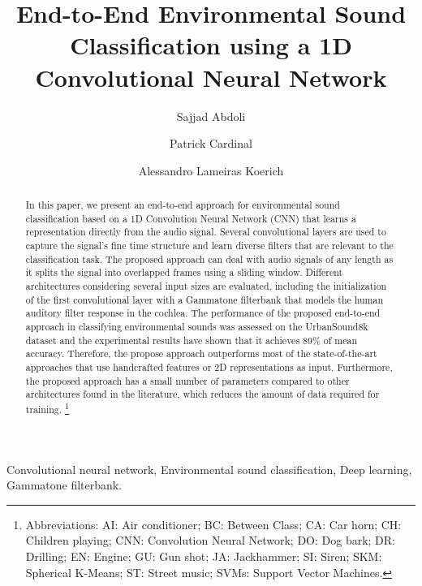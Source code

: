 \documentclass[preprint,final,12pt]{elsarticle}
\newcommand\blfootnote[1]{\begingroup
  \renewcommand\thefootnote{}\footnote{#1}\addtocounter{footnote}{-1}\endgroup
}
\begin{document}
\begin{frontmatter}

\title{End-to-End Environmental Sound Classification using a 1D Convolutional Neural Network}


\author{Sajjad Abdoli}
\author{Patrick Cardinal}
\author{Alessandro Lameiras Koerich}

\address{Department of Software and IT Engineering, \'{E}cole de Technologie Sup\'{e}rieure, Universit\'{e} du Qu\'{e}bec, H3C 1K, Montreal, QC, Canada}



\begin{abstract}
In this paper, we present an end-to-end approach for environmental sound classification based on a 1D Convolution Neural Network (CNN) that learns a representation directly from the audio signal. Several convolutional layers are used to capture the signal's fine time structure and learn diverse filters that are relevant to the classification task. The proposed approach can deal with audio signals of any length as it splits the signal into overlapped frames using a sliding window. Different architectures considering several input sizes are evaluated, including the initialization of the first convolutional layer with a Gammatone filterbank that models the human auditory filter response in the cochlea. The performance of the proposed end-to-end approach in classifying environmental sounds was assessed on the UrbanSound8k dataset and the experimental results have shown that it achieves 89\% of mean accuracy. Therefore, the propose approach outperforms most of the state-of-the-art approaches that use handcrafted features or 2D representations as input. Furthermore, the proposed approach has a small number of parameters compared to other architectures found in the literature, which reduces the amount of data required for training.\blfootnote{ Abbreviations: AI: Air conditioner; BC: Between Class; CA: Car horn; CH: Children playing; CNN: Convolution Neural Network; DO: Dog bark; DR: Drilling; EN: Engine; GU: Gun shot; JA: Jackhammer; SI: Siren; SKM: Spherical K-Means; ST: Street music; SVMs: Support Vector Machines.}
\end{abstract}

\begin{keyword}
Convolutional neural network, Environmental sound classification, Deep learning, Gammatone filterbank.
\end{keyword}
\end{frontmatter}
\end{document}
